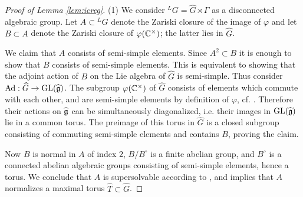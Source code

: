 \documentclass{article}
\theoremstyle{definition}
\numberwithin{equation}{section}
\renewcommand{\-}{\hyp{}}
\newcommand{\warn}[1]{{\leavevmode\color{red}[#1]}}
\newcommand{\Cent}{\mathrm{Cent}}
\begin{document}
\begin{proof}[Proof of Lemma \ref{lem:icreg}]
(1) We consider $^LG = \hat G \rtimes \Gamma$ as a disconnected algebraic group. Let $A \subset {^LG}$ denote the Zariski closure of the image of $\varphi$ and let $B \subset A$ denote the Zariski closure of $\varphi(\mathbb{C}^\times)$; the latter lies in $\hat G$. 

We claim that $A$ consists of semi-simple elements. Since $A^2 \subset B$ it is enough to show that $B$ consists of semi-simple elements. This is equivalent to showing that the adjoint action of $B$ on the Lie algebra of $\hat G$ is semi-simple. Thus consider $\textrm{Ad} : \widehat G \to \textrm{GL}(\mathfrak{\widehat g})$. The subgroup $\varphi(\mathbb{C}^\times)$ of $\hat G$ consists of elements which commute with each other, and are semi-simple elements by definition of $\varphi$, cf. \cite[\S8]{BorCor}. Therefore their actions on $\mathfrak{\widehat g}$ can be simultaneously diagonalized, i.e. their images in $\textrm{GL}(\mathfrak{\widehat g})$ lie in a common torus. The preimage of this torus in $\hat G$ is a closed subgroup consisting of commuting semi-simple elements and contains $B$, proving the claim.

Now $B$ is normal in $A$ of index $2$, $B/B^\circ$ is a finite abelian group, and $B^\circ$ is a connected abelian algebraic groups consisting of semi-simple elements, hence a torus. We conclude that $A$ is supersolvable according to \cite[Definition 5.14]{SS70}, and \cite[Theorem 5.16]{SS70} implies that $A$ normalizes a maximal torus $\hat T \subset \hat G$.





\end{proof}
\end{document}
